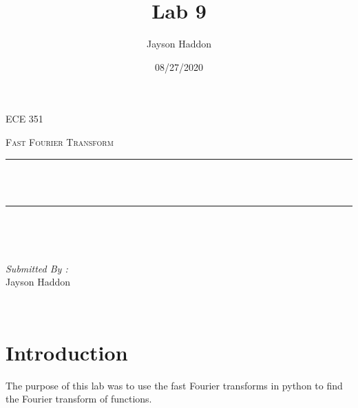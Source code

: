 \documentclass[11pt,a4]{report}
\title{Lab 9}
\author{Jayson Haddon}
\date{08/27/2020}
\makeatletter
\let\thetitle\@title
\makeatother
\begin{document}

\begin{titlepage}
	\centering
    \vspace*{0.5 cm}
\begin{center}    \textsc{\Large   ECE 351 }\\[2.0 cm]	\end{center}%
	\textsc{\Large Fast Fourier Transform  }\\[0.5 cm]				%
	\rule{\linewidth}{0.2 mm} \\[0.4 cm]
	{ \huge \bfseries \thetitle}\\
	\rule{\linewidth}{0.2 mm} \\[1.5 cm]
	
	\begin{minipage}{0.4\textwidth}
		\begin{flushleft} \large
			\end{flushleft}
			\end{minipage}~
			\begin{minipage}{0.4\textwidth}
            
			\begin{flushright} \large
			\emph{Submitted By :} \\
			Jayson Haddon  
		\end{flushright}
           
	\end{minipage}\\[2 cm]
	
    
    
    
    
	
\end{titlepage}

\tableofcontents
\pagebreak

\renewcommand{\thesection}{\arabic{section}}
\section{Introduction}
The purpose of this lab was to use the fast Fourier transforms in python to find the Fourier transform of functions. 
\end{document}
